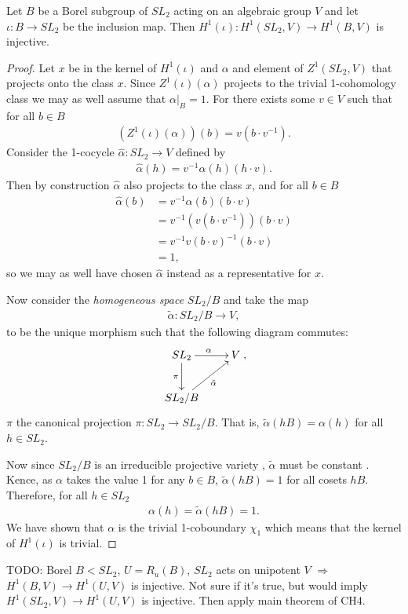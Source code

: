 \begin{lemma} Let $B$ be a Borel subgroup of $SL_2$ acting on an algebraic group $V$ and let $\iota : B \rightarrow SL_2$ be the inclusion map. Then $H^1(\iota):H^1(SL_2, V)\rightarrow H^1(B, V)$ is injective.
  \label{lem:sl2_b_inj}
\end{lemma}
\begin{proof}
Let $x$ be in the kernel of $H^1(\iota)$ and $\alpha$ and element of $Z^1(SL_2, V)$ that projects onto the class $x$. Since $Z^1(\iota)(\alpha)$ projects to the trivial 1-cohomology class we may as well assume that $\alpha|_B = 1$. For there exists some $v \in V$ such that for all $b \in B$
\begin{align}
	\left(Z^1(\iota)(\alpha) \right)(b) = v (b \cdot v^{-1}).
\end{align}
Consider the 1-cocycle $\hat{\alpha}:SL_2\rightarrow V$ defined by
\begin{align}
	\hat{\alpha}(h) = v^{-1} \alpha(h) (h \cdot v).
\end{align}
Then by construction $\hat{\alpha}$ also projects to the class $x$, and for all $b \in B$
\begin{align*}
	\hat{\alpha}(b) &=  v^{-1} \alpha(b) (b \cdot v) \\
	&=  v^{-1} (v (b\cdot v^{-1})) (b \cdot v)\\
	&=  v^{-1} v (b\cdot v)^{-1} (b \cdot v)\\
	&=  1,
\end{align*}
so we may as well have chosen $\hat{\alpha}$ instead as a representative for $x$. 

Now consider the \emph{homogeneous space} $SL_2/B$ and take the map 
\begin{align}
	\tilde{\alpha}:SL_2/B \rightarrow V,
\end{align}
to be the unique morphism such that the following diagram commutes:
\begin{align}
	\xymatrix{
	SL_2 \ar[r]^{\alpha} \ar[d]_{\pi} & V\\
	SL_2/B \ar[ru]_{\tilde{\alpha}}
	},
\end{align}
$\pi$ the canonical projection $\pi:SL_2 \rightarrow SL_2/B$. That is, $\tilde{\alpha}(hB) = \alpha(h)$ for all $h \in SL_2$.

Now since $SL_2/B$ is an irreducible projective variety \cite[Theorem 21.3]{humphreys1975linear}, $\tilde{\alpha}$ must be constant  \cite{borel1991linear}. Kence, as $\alpha$ takes the value 1 for any $b \in B$, $\tilde{\alpha}(hB) = 1$ for all cosets $hB$. Therefore, for all $h \in SL_2$
\begin{align}
	\alpha(h) = \tilde{\alpha}(hB) = 1.
\end{align}
We have shown that $\alpha$ is the trivial 1-coboundary $\chi_1$ which means that the kernel of $H^1(\iota)$ is trivial.
\end{proof} 

TODO: Borel $B < SL_2$, $U = R_u(B)$, $SL_2$ acts on unipotent $V$ $\Rightarrow$ $H^1(B, V) \rightarrow H^1(U, V)$ is injective. Not sure if it's true, but would imply $H^1(SL_2, V) \rightarrow H^1(U, V)$ is injective. Then apply main theorem of CH4.
